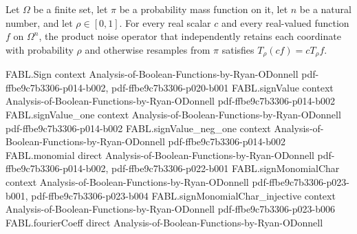 \begin{theorem}
\label{FABL.productNoiseOperator_smul}
\leanok
{}
Let $\Omega$ be a finite set, let $\pi$ be a probability mass function on it,
let $n$ be a natural number, and let $\rho\in[0,1]$. For every real scalar $c$ and
every real-valued function $f$ on $\Omega^n$, the product noise operator that
independently retains each coordinate with probability $\rho$ and otherwise
resamples from $\pi$ satisfies $T_\rho(cf)=cT_\rho f$.
\end{theorem}

\begin{theorem}
\label{FABL.FiniteFourierBasis.productNoiseOperator_fourier_expansion}
\leanok
{}
\proofstep
  {FABL.Sign}
  {context}
  {Analysis-of-Boolean-Functions-by-Ryan-ODonnell}
  {pdf-ffbe9c7b3306-p014-b002,
    pdf-ffbe9c7b3306-p020-b001}
\proofstep
  {FABL.signValue}
  {context}
  {Analysis-of-Boolean-Functions-by-Ryan-ODonnell}
  {pdf-ffbe9c7b3306-p014-b002}
\proofstep
  {FABL.signValue_one}
  {context}
  {Analysis-of-Boolean-Functions-by-Ryan-ODonnell}
  {pdf-ffbe9c7b3306-p014-b002}
\proofstep
  {FABL.signValue_neg_one}
  {context}
  {Analysis-of-Boolean-Functions-by-Ryan-ODonnell}
  {pdf-ffbe9c7b3306-p014-b002}
\proofstep
  {FABL.monomial}
  {direct}
  {Analysis-of-Boolean-Functions-by-Ryan-ODonnell}
  {pdf-ffbe9c7b3306-p014-b002,
    pdf-ffbe9c7b3306-p022-b001}
\proofstep
  {FABL.signMonomialChar}
  {context}
  {Analysis-of-Boolean-Functions-by-Ryan-ODonnell}
  {pdf-ffbe9c7b3306-p023-b001,
    pdf-ffbe9c7b3306-p023-b004}
\proofstep
  {FABL.signMonomialChar_injective}
  {context}
  {Analysis-of-Boolean-Functions-by-Ryan-ODonnell}
  {pdf-ffbe9c7b3306-p023-b006}
\proofstep
  {FABL.fourierCoeff}
  {direct}
  {Analysis-of-Boolean-Functions-by-Ryan-ODonnell}

\end{theorem}
